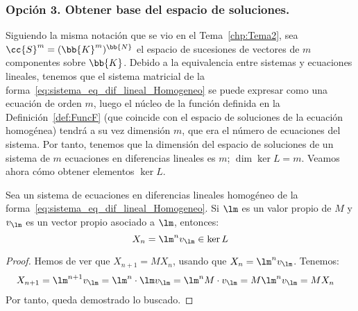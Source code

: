 \subsubsection{Opción 3. Obtener base del espacio de soluciones.}

Siguiendo la misma notación que se vio en el Tema~\ref{chp:Tema2}, sea $\cc{S}^m = (\bb{K}^m)^\bb{N}$ el espacio de sucesiones de vectores de $m$ componentes sobre $\bb{K}$. Debido a la equivalencia entre sistemas y ecuaciones lineales, tenemos que el sistema matricial de la forma~\ref{eq:sistema_eq_dif_lineal_Homogeneo} se puede expresar como una ecuación de orden $m$, luego el núcleo de la función definida en la Definición~\ref{def:FuncF} (que coincide con el espacio de soluciones de la ecuación homogénea) tendrá a su vez dimensión $m$, que era el número de ecuaciones del sistema. Por tanto, tenemos que la dimensión del espacio de soluciones de un sistema de $m$ ecuaciones en diferencias lineales es $m$; $\dim \ker L=m$. Veamos ahora cómo obtener elementos $\ker L$.
\begin{prop}
    Sea un sistema de ecuaciones en diferencias lineales homogéneo de la forma~\ref{eq:sistema_eq_dif_lineal_Homogeneo}. Si $\lm$ es un valor propio de $M$ y $v_\lm$ es un vector propio asociado a $\lm$, entonces:
    \begin{equation*}
        X_n = \lm^n v_\lm \in \ker L
    \end{equation*}
    \begin{proof}
        Hemos de ver que $X_{n+1}=MX_n$, usando que $X_n=\lm^nv_\lm$. Tenemos:
        \begin{align*}
            X_{n+1} &= \lm^{n+1}v_{\lm} = \lm^n\cdot \lm v_{\lm}
            = \lm^nM\cdot v_\lm = M\lm^nv_\lm = MX_n
        \end{align*}
        Por tanto, queda demostrado lo buscado.
    \end{proof}
\end{prop}

